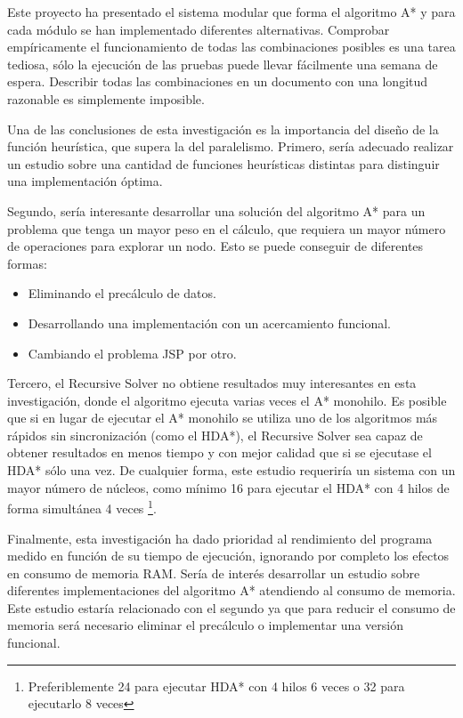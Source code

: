 Este proyecto ha presentado el sistema modular que forma el algoritmo A* y
para cada módulo se han implementado diferentes alternativas.
Comprobar empíricamente el funcionamiento de todas las combinaciones posibles
es una tarea tediosa, sólo la ejecución de las pruebas puede llevar fácilmente una
semana de espera.
Describir todas las combinaciones en un documento con una longitud razonable
es simplemente imposible.

Una de las conclusiones de esta investigación es la importancia del diseño
de la función heurística, que supera la del paralelismo.
Primero, sería adecuado realizar un estudio sobre una cantidad de funciones heurísticas
distintas para distinguir una implementación óptima.

Segundo, sería interesante desarrollar una solución del algoritmo A*
para un problema que tenga un mayor peso en el cálculo,
que requiera un mayor número de operaciones para explorar un nodo.
Esto se puede conseguir de diferentes formas:
\begin{itemize}[itemsep=0.25px]
    \item Eliminando el precálculo de datos.
    \item Desarrollando una implementación con un acercamiento funcional.
    \item Cambiando el problema JSP por otro.
\end{itemize}

Tercero, el Recursive Solver no obtiene resultados muy interesantes
en esta investigación, donde el algoritmo ejecuta varias veces el A*
monohilo.
Es posible que si en lugar de ejecutar el A* monohilo se utiliza
uno de los algoritmos más rápidos sin sincronización (como el HDA*),
el Recursive Solver sea capaz de obtener resultados en menos tiempo
y con mejor calidad que si se ejecutase el HDA* sólo una vez.
De cualquier forma, este estudio requeriría un sistema con un mayor número
de núcleos, como mínimo 16 para ejecutar el HDA* con 4 hilos de forma
simultánea 4 veces
\footnote{Preferiblemente 24 para ejecutar HDA* con 4 hilos 6 veces o 32 para ejecutarlo 8 veces}.

Finalmente, esta investigación ha dado prioridad al rendimiento del programa
medido en función de su tiempo de ejecución,
ignorando por completo los efectos en consumo de memoria RAM.
Sería de interés desarrollar un estudio sobre diferentes implementaciones
del algoritmo A* atendiendo al consumo de memoria.
Este estudio estaría relacionado con el segundo ya que para reducir el consumo
de memoria será necesario eliminar el precálculo o implementar una versión funcional.

